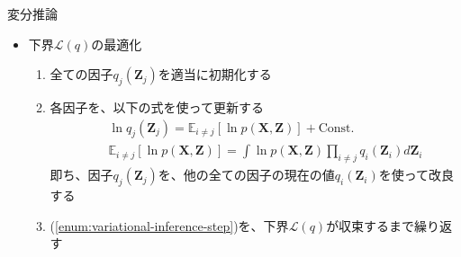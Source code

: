 \documentclass[dvipdfmx,notheorems,t]{beamer}
\begin{document}
\begin{frame}{変分推論}

\begin{itemize}
	\item 下界$\mathcal{L}(q)$の最適化
	\begin{enumerate}
		\item 全ての因子$q_j(\bm{Z}_j)$を適当に初期化する
		\newline
		\item 各因子を、以下の式を使って更新する \label{enum:variational-inference-step}
		\begin{eqnarray}
			&& \ln q_j(\bm{Z}_j) = \mathbb{E}_{i \neq j}[\ln p(\bm{X}, \bm{Z})] + \mathrm{Const.} \\
			&& \mathbb{E}_{i \neq j}[\ln p(\bm{X}, \bm{Z})] = \int \ln p(\bm{X}, \bm{Z}) \prod_{i \neq j} q_i(\bm{Z}_i) d\bm{Z}_i
		\end{eqnarray}
		即ち、因子$q_j(\bm{Z}_j)$を、他の全ての因子の現在の値$q_i(\bm{Z}_i)$を使って改良する
		\newline
		\item (\ref{enum:variational-inference-step})を、下界$\mathcal{L}(q)$が収束するまで繰り返す
	\end{enumerate}
\end{itemize}

\end{frame}
\end{document}
